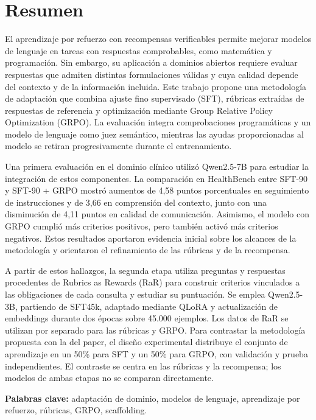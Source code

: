 \chapter*{Resumen}
El aprendizaje por refuerzo con recompensas verificables permite mejorar modelos de lenguaje en tareas con respuestas comprobables, como matemática y programación. Sin embargo, su aplicación a dominios abiertos requiere evaluar respuestas que admiten distintas formulaciones válidas y cuya calidad depende del contexto y de la información incluida. Este trabajo propone una metodología de adaptación que combina ajuste fino supervisado (SFT), rúbricas extraídas de respuestas de referencia y optimización mediante Group Relative Policy Optimization (GRPO). La evaluación integra comprobaciones programáticas y un modelo de lenguaje como juez semántico, mientras las ayudas proporcionadas al modelo se retiran progresivamente durante el entrenamiento.

Una primera evaluación en el dominio clínico utilizó Qwen2.5-7B para estudiar la integración de estos componentes. La comparación en HealthBench entre SFT-90 y SFT-90 + GRPO mostró aumentos de 4,58 puntos porcentuales en seguimiento de instrucciones y de 3,66 en comprensión del contexto, junto con una disminución de 4,11 puntos en calidad de comunicación. Asimismo, el modelo con GRPO cumplió más criterios positivos, pero también activó más criterios negativos. Estos resultados aportaron evidencia inicial sobre los alcances de la metodología y orientaron el refinamiento de las rúbricas y de la recompensa.

A partir de estos hallazgos, la segunda etapa utiliza preguntas y respuestas procedentes de Rubrics as Rewards (RaR) para construir criterios vinculados a las obligaciones de cada consulta y estudiar su puntuación. Se emplea Qwen2.5-3B, partiendo de SFT45k, adaptado mediante QLoRA y actualización de embeddings durante dos épocas sobre 45.000 ejemplos. Los datos de RaR se utilizan por separado para las rúbricas y GRPO. Para contrastar la metodología propuesta con la del paper, el diseño experimental distribuye el conjunto de aprendizaje en un 50\% para SFT y un 50\% para GRPO, con validación y prueba independientes. El contraste se centra en las rúbricas y la recompensa; los modelos de ambas etapas no se comparan directamente.

\bigskip
\noindent\textbf{Palabras clave:} adaptación de dominio, modelos de lenguaje, aprendizaje por refuerzo, rúbricas, GRPO, scaffolding.
\clearpage

